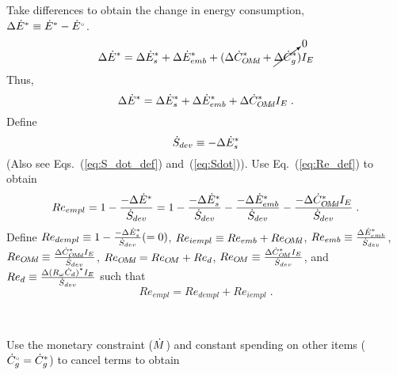 \begin{landscape}
{Take differences to obtain the change in energy consumption, \\
$\Delta {\dot{E}}^* \equiv {\dot{E}}^* - {}{\dot{E}}^{\scriptscriptstyle \circ}$.
%
\begin{equation}
  \Delta {\dot{E}}^* = \Delta {\dot{E}}^*_s
                      + \Delta {\dot{E}}^*_{emb}
                      + (\Delta {\dot{C}}^*_{O\!M\!d}
                      + \cancelto{0}{\Delta {\dot{C}}^*_g}) I_E
\end{equation}
%
Thus, 
%
\begin{equation}
\Delta {\dot{E}}^* = \Delta {\dot{E}}^*_s + \Delta {\dot{E}}^*_{emb} + \Delta {\dot{C}}^*_{O\!M\!d} I_E \; .
\end{equation}
%
Define
%
\begin{equation} \label{eq:Sdot_def}
\dot{S}_{dev} \equiv -\Delta {\dot{E}}^*_s
\end{equation}
%
(Also see Eqs.~(\ref{eq:S_dot_def}) and~(\ref{eq:Sdot})). 
Use Eq.~(\ref{eq:Re_def}) to obtain
%
\begin{equation}
Re_{empl} = 1 - \frac{-\Delta {\dot{E}}^*}{\dot{S}_{dev}} 
          = 1 - \frac{-\Delta {\dot{E}}^*_s}{\dot{S}_{dev}} 
              - \frac{-\Delta {\dot{E}}^*_{emb}}{\dot{S}_{dev}}
              - \frac{-\Delta {\dot{C}}^*_{O\!M\!d} I_E}{\dot{S}_{dev}} \; .
\end{equation}
%
Define $Re_{dempl} \equiv 1 - \frac{-\Delta {\dot{E}}^*_s}{\dot{S}_{dev}} (= 0)$, 
$Re_{iempl} \equiv Re_{emb} + Re_{O\!M\!d}$, 
$Re_{emb} \equiv \frac{\Delta {\dot{E}}^*_{emb}}{\dot{S}_{dev}}$,
$Re_{O\!M\!d} \equiv \frac{\Delta {\dot{C}}^*_{O\!M\!d} I_E}{\dot{S}_{dev}}$, 
$Re_{O\!M\!d} = Re_{O\!M} + Re_d$,
$Re_{O\!M} \equiv \frac{\Delta {\dot{C}}^*_{O\!M} I_E}{\dot{S}_{dev}}$, and 
$Re_d \equiv \frac{\Delta {(R_\omega \dot{C}_d)}^* I_E}{\dot{S}_{dev}}$
such that
%
\begin{equation} \label{eq:Re_empl_def}
Re_{empl} = Re_{dempl} + Re_{iempl} \; .
\end{equation}
}
{
~
    
Use the monetary constraint ($\dot{M}$)
and constant spending on other items (${}{\dot{C}}^{\scriptscriptstyle \circ}_g = {\dot{C}}^*_g$) to cancel terms to obtain

}
\end{landscape}
